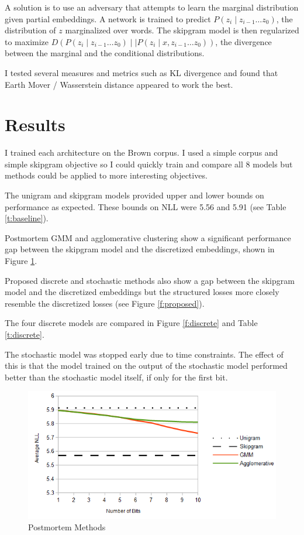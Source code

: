 \documentclass[sigconf]{acmart}
\begin{document}
A solution is to use an adversary that attempts to learn the marginal distribution given partial embeddings.
A network is trained to predict $P(z_i \mid z_{i-1} \ldots z_0)$, the distribution of $z$ marginalized over words.
The skipgram model is then regularized to maximize $D( P(z_i \mid z_{i-1} \ldots z_0) \mid \mid P(z_i \mid x, z_{i-1} \ldots z_0))$, 
the divergence between the marginal and the conditional distributions.

I tested several measures and metrics such as KL divergence and found that Earth Mover / Wasserstein distance appeared to work the best.

\section{Results}

I trained each architecture on the Brown corpus. I used a simple corpus and simple skipgram objective so I could quickly train and compare all 8 models but methods could be applied to more interesting objectives.

The unigram and skipgram models provided upper and lower bounds on performance as expected. These bounds on NLL were 5.56 and 5.91 (see Table \ref{t:baseline}).

Postmortem GMM and agglomerative clustering show a significant performance gap between the skipgram model and the discretized embeddings, shown in Figure \ref{f:postmortem}.

Proposed discrete and stochastic methods also show a gap between the skipgram model and the discretized embeddings but the structured losses more closely resemble the discretized losses (see Figure \ref{f:proposed}).

The four discrete models are compared in Figure \ref{f:discrete} and Table \ref{t:discrete}.

The stochastic model was stopped early due to time constraints. The effect of this is that the model trained on the output of the stochastic model performed better than the stochastic model itself, if only for the first bit.

\begin{figure}
\caption{Postmortem Methods}
\label{f:postmortem}
\includegraphics[scale=0.5]{images/postmortem.png}
\end{figure}
\end{document}
